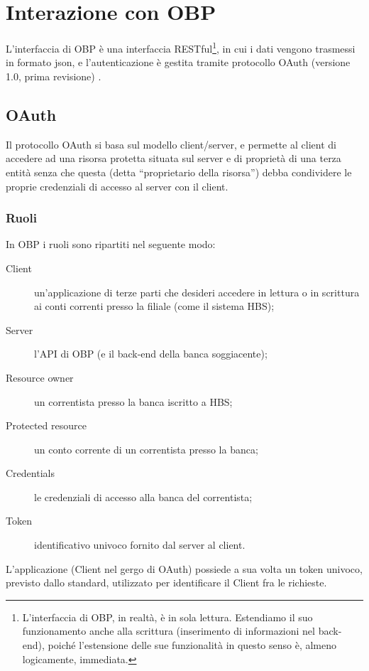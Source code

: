 
\section{Interazione con OBP}
\label{sec:OBP}

L'interfaccia di OBP è una interfaccia RESTful\footnote{L'interfaccia di OBP, in realtà, è in sola lettura. Estendiamo il suo funzionamento anche alla scrittura (inserimento di informazioni nel back-end), poiché l'estensione delle sue funzionalità in questo senso è, almeno logicamente, immediata.}, in cui i dati vengono trasmessi in formato json, e l'autenticazione è gestita tramite protocollo OAuth (versione 1.0, prima revisione) \cite{oauthrfc}.

\subsection{OAuth}

Il protocollo OAuth si basa sul modello client/server, e permette al client di accedere ad una risorsa protetta situata sul server e di propriet\`a di una terza entit\`a senza che questa (detta ``proprietario della risorsa'') debba condividere le proprie credenziali di accesso al server con il client.

\subsubsection{Ruoli}

In OBP i ruoli sono ripartiti nel seguente modo:
\begin{description}
	\item[Client] un'applicazione di terze parti che desideri accedere in lettura o in scrittura ai conti correnti presso la filiale (come il sistema HBS);
	\item[Server] l'API di OBP (e il back-end della banca soggiacente);
	\item[Resource owner] un correntista presso la banca iscritto a HBS;
	\item[Protected resource] un conto corrente di un correntista presso la banca;
	\item[Credentials] le credenziali di accesso alla banca del correntista;
	\item[Token] identificativo univoco fornito dal server al client.
\end{description}
L'applicazione (Client nel gergo di OAuth) possiede a sua volta un token univoco, previsto dallo standard, utilizzato per identificare il Client fra le richieste.

